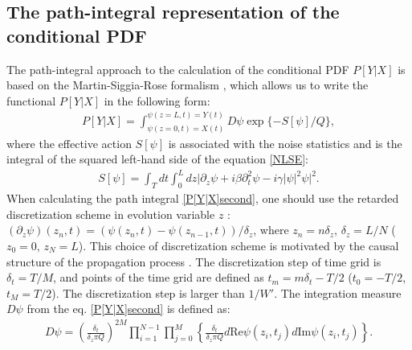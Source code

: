 \documentclass{article}
\begin{document}
\subsection{The path-integral representation of the conditional PDF}
The path-integral approach to the calculation of the conditional PDF $P[Y|X]$ is based on the Martin-Siggia-Rose formalism \cite{terekhov2014conditional}, which allows us to write the functional $P[Y|X]$ in the following form: 
\begin{align}\label{P[Y|X]second}
    P[Y|X] = \int_{\psi(z=0,t)=X(t)}^{\psi(z=L,t)=Y(t)} D\psi \exp\{-S[\psi]/Q\},
\end{align}
where the effective action $S[\psi]$ is associated with the noise statistics and is the integral of the squared left-hand side of the equation \eqref{NLSE}:
\begin{eqnarray}\label{3action}
    S[\psi] = \int_{T} dt \int_{0}^{L} dz \big|\partial_{z}\psi + i\beta \partial_{t}^{2}\psi - i\gamma |\psi|^{2}\psi\big|^{2}.
\end{eqnarray}
When calculating the path integral \eqref{P[Y|X]second}, one should use the retarded discretization scheme in evolution variable $z$ \cite{terekhov2014conditional}: $(\partial_{z}\psi)(z_{n},t) = (\psi(z_{n},t)-\psi(z_{n-1},t))/\delta_{z}$, where $z_{n} = n\delta_{z}$, $\delta_{z}=L/N$ ($z_{0}=0,\,z_{N}=L$). This choice of discretization scheme is motivated by the causal structure of the propagation process \cite{hochberg1999effective, terekhov2014conditional}. The discretization step of time grid is $\delta_{t} = T/M$, and points of the time grid are defined as $t_m = m\delta_t - T/2$ ($t_0 = -T/2$, $t_M=T/2$). The discretization step is larger than $1/W'$. The integration measure $D\psi$ from the eq. \eqref{P[Y|X]second} is defined as:
\begin{eqnarray}
    D\psi = \left(\frac{\delta_t}{\delta_z \pi Q}\right)^{2M} \prod_{i=1}^{N-1} \prod_{j=0}^{M} \left\{\frac{\delta_t}{\delta_z \pi Q}d\textrm{Re} \psi (z_i,t_j) d\textrm{Im} \psi (z_i,t_j)\right\}.
\end{eqnarray}
\end{document}
